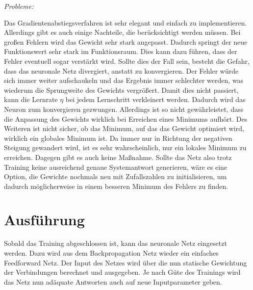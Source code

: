 \emph{Probleme:}

Das Gradientenabstiegsverfahren ist sehr elegant und einfach zu implementieren. Allerdings gibt es auch einige Nachteile, die berücksichtigt werden müssen. Bei großen Fehlern wird das Gewicht sehr stark angepasst. Dadurch springt der neue Funktionswert sehr stark im Funktionsraum. Dies kann dazu führen, dass der Fehler eventuell sogar verstärkt wird. Sollte dies der Fall sein, besteht die Gefahr, dass das neuronale Netz divergiert, anstatt zu konvergieren. Der Fehler würde sich immer weiter aufschaukeln und das Ergebnis immer schlechter werden, was wiederum die Sprungweite des Gewichts vergrößert. Damit dies nicht passiert, kann die Lernrate $\eta$ bei jedem Lernschritt verkleinert werden. Dadurch wird das Neuron zum konvergieren gezwungen. Allerdings ist so nicht gewährleistet, dass die Anpassung des Gewichts wirklich bei Erreichen eines Minimums aufhört.
Des Weiteren ist nicht sicher, ob das Minimum, auf das das Gewicht optimiert wird, wirklich ein globales Minimum ist. Da immer nur in Richtung der negativen Steigung gewandert wird, ist es sehr wahrscheinlich, nur ein lokales Minimum zu erreichen. Dagegen gibt es auch keine Maßnahme. Sollte das Netz also trotz Training keine ausreichend genaue Systemantwort generieren, wäre es eine Option, die Gewichte nochmals neu mit Zufallszahlen zu initialisieren, um dadurch möglicherweise in einem besseren Minimum des Fehlers zu finden.

\section{Ausführung}
Sobald das Training abgeschlossen ist, kann das neuronale Netz eingesetzt werden. Dazu wird aus dem Backpropagation Netz wieder ein einfaches Feedforward Netz. Der Input des Netzes wird über die nun statische Gewichtung der Verbindungen berechnet und ausgegeben. Je nach Güte des Trainings wird das Netz nun adäquate Antworten auch auf neue Inputparameter geben.